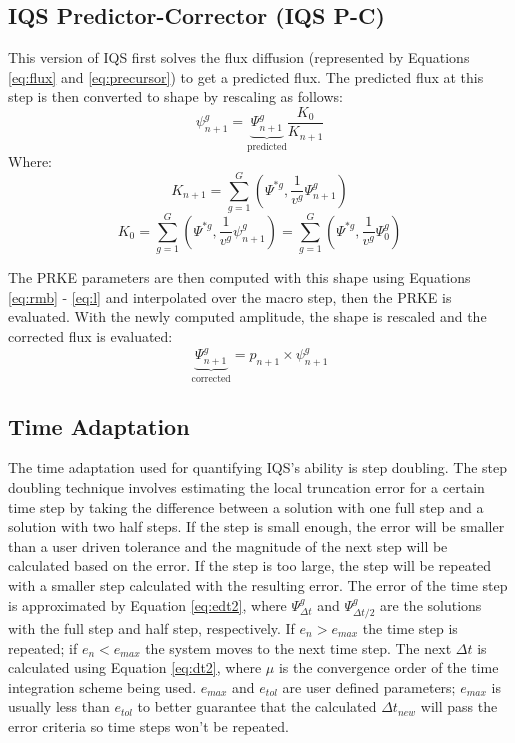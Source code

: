 \documentclass{anstrans}
\newcommand{\be}{\begin{equation}}
\newcommand{\ee}{\end{equation}}
\begin{document}
\subsection{IQS Predictor-Corrector (IQS P-C)}

This version of IQS first solves the flux diffusion (represented by Equations \ref{eq:flux} and \ref{eq:precursor}) to get a predicted flux.  The predicted flux at this step is then converted to shape by rescaling as follows:
\be
\psi^g_{n+1} = \underbrace{\Psi^g_{n+1}}_{\text{predicted}} \frac{K_0}{K_{n+1}}
\label{eq:rescale}
\ee
Where:
\be
K_{n+1} =\sum_{g=1}^G\left(\Psi^{*g},\frac{1}{v^g}\Psi^g_{n+1}\right)
\ee
\be
K_{0} =\sum_{g=1}^G\left(\Psi^{*g},\frac{1}{v^g}\psi^g_{n+1}\right)=\sum_{g=1}^G\left(\Psi^{*g},\frac{1}{v^g}\Psi^g_{0}\right)
\ee

The PRKE parameters are then computed with this shape using Equations \ref{eq:rmb} - \ref{eq:l} and interpolated over the macro step, then the PRKE is evaluated.  With the newly computed amplitude, the shape is rescaled and the corrected flux is evaluated:
\be
\underbrace{\Psi^g_{n+1}}_{\text{corrected}} = p_{n+1} \times \psi^g_{n+1}
\ee

\subsection{Time Adaptation}

The time adaptation used for quantifying IQS's ability is step doubling.  The step doubling technique involves estimating the local truncation error for a certain time step by taking the difference between a solution with one full step and a solution with two half steps.  If the step is small enough, the error will be smaller than a user driven tolerance and the magnitude of the next step will be calculated based on the error.  If the step is too large, the step will be repeated with a smaller step calculated with the resulting error.  The error of the time step is approximated by Equation \ref{eq:edt2}, where $\Psi^g_{\Delta t}$ and $\Psi^g_{\Delta t/2}$ are the solutions with the full step and half step, respectively.  If $e_n > e_{max}$ the time step is repeated; if $e_n < e_{max}$ the system moves to the next time step.  The next $\Delta t$ is calculated using Equation \ref{eq:dt2}, where $\mu$ is the convergence order of the time integration scheme being used.  $e_{max}$ and $e_{tol}$ are user defined parameters; $e_{max}$ is usually less than $e_{tol}$ to better guarantee that the calculated $\Delta t_{new}$ will pass the error criteria so time steps won't be repeated.
\end{document}
